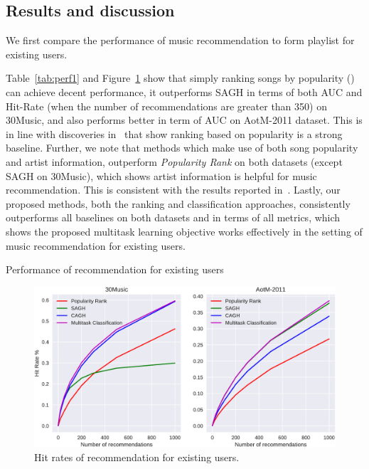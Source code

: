 \subsection{Results and discussion}
We first compare the performance of music recommendation to form playlist for existing users.

Table~\ref{tab:perf1} and Figure~\ref{fig:hr1} show that simply ranking songs by popularity () 
can achieve decent performance,
it outperforms SAGH in terms of both AUC and Hit-Rate (when the number of recommendations are greater than 350) on 30Music,
and also performs better in term of AUC on AotM-2011 dataset.
This is in line with discoveries in~\cite{bonnin2013evaluating,jannach2015beyond,bonnin2015automated} that show ranking based on
popularity is a strong baseline.
Further, we note that methods which make use of both song popularity and artist information,
outperform {\it Popularity Rank} on both datasets (except SAGH on 30Music), which shows artist information is helpful for music recommendation.
This is consistent with the results reported in~\cite{bonnin2013evaluating,bonnin2015automated}.
Lastly, our proposed methods, both the ranking and classification approaches, consistently outperforms all baselines
on both datasets and in terms of all metrics, which shows the proposed multitask learning objective works effectively
in the setting of music recommendation for existing users.

\begin{table}[t]
\centering
\caption{Performance of recommendation for existing users}
\label{tab:perf1}
\resizebox{\columnwidth}{!}{

}
\end{table}


\begin{figure}[t]
\centering
\includegraphics[width=\linewidth]{fig/hitrate1.pdf}
\caption{Hit rates of recommendation for existing users.}
\label{fig:hr1}
\end{figure}


